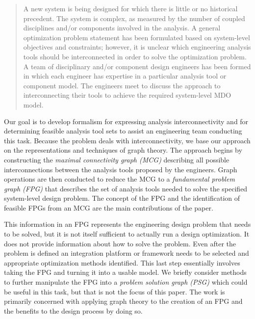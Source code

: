     \begin{quote}
    A new system is being designed for which there is little or no historical precedent. The system
    is complex, as measured by the number of coupled disciplines and/or components involved in the
    analysis. A general optimization problem statement has been formulated based on system-level objectives and constraints; however, it is unclear which engineering analysis tools should
    be interconnected in order to solve the optimization problem. A team of disciplinary and/or component design engineers has been formed in which each engineer has expertise in a
    particular analysis tool or component model. The engineers meet to discuss the approach to
    interconnecting their tools to achieve the required system-level MDO model.
    \end{quote}

    Our goal is to develop formalism for expressing analysis interconnectivity and for determining feasible
    analysis tool sets to assist an engineering team conducting this task. Because the problem deals with
    interconnectivity, we base our approach on the representations and techniques of graph theory.
    The approach begins by constructing the \emph{maximal connectivity graph (MCG)} describing all possible
    interconnections between the analysis tools proposed by the engineers. Graph operations are then
    conducted to reduce the MCG to a \emph{fundamental problem graph (FPG)} that describes the set of analysis
    tools needed to solve the specified system-level design problem. The concept of the FPG and the identification of feasible FPGs from an MCG are the main contributions of the paper.

    This information in an FPG represents the engineering design problem that needs to be solved, but it is not 
    itself sufficient to actually run a design optimization. It does not provide information 
    about how to solve the problem. Even after the problem is defined an integration platform or framework needs 
    to be selected and appropriate optimization methods identified. This last step essentially 
    involves taking the FPG and turning it into a usable model. We briefly consider methods to further 
    manipulate the FPG into a \emph{problem solution graph (PSG)} which could be useful in this 
    task, but that is not the focus of this paper. The work is primarily concerned with applying graph 
    theory to the creation of an FPG and the benefits to the design process by doing so. 
    
